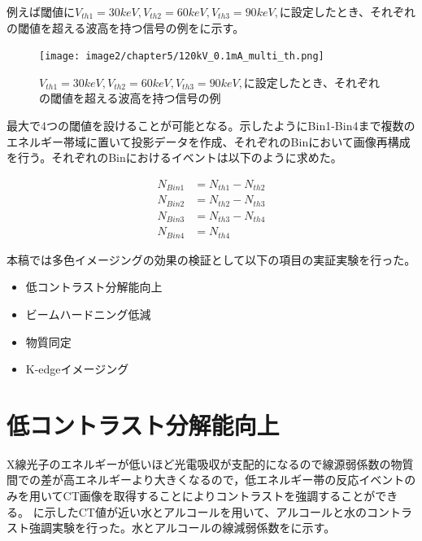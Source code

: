 例えば閾値に$V_{th1}=30keV, V_{th2}=60keV, V_{th3}=90keV,$に設定したとき、それぞれの閾値を超える波高を持つ信号の例をに示す。

\begin{figure}[H]
 \begin{center}
 \texttt{[image: image2/chapter5/120kV\_0.1mA\_multi\_th.png]} 
 \end{center}
 \caption{$V_{th1}=30keV, V_{th2}=60keV, V_{th3}=90keV,$に設定したとき、それぞれの閾値を超える波高を持つ信号の例}
 \label{fig:120kV_0.1mA_multi_th}
\end{figure}

最大で4つの閾値を設けることが可能となる。示したようにBin1-Bin4まで複数のエネルギー帯域に置いて投影データを作成、それぞれのBinにおいて画像再構成を行う。それぞれのBinにおけるイベントは以下のように求めた。

\begin{align}
N_{Bin1}&=N_{th1}-N_{th2}\\
N_{Bin2}&=N_{th2}-N_{th3}\\
N_{Bin3}&=N_{th3}-N_{th4}\\
N_{Bin4}&=N_{th4}
\end{align}


本稿では多色イメージングの効果の検証として以下の項目の実証実験を行った。

\begin{itemize}
\item 低コントラスト分解能向上
\item ビームハードニング低減
\item 物質同定
\item K-edgeイメージング
\end{itemize}


\section{低コントラスト分解能向上}
X線光子のエネルギーが低いほど光電吸収が支配的になるので線源弱係数の物質間での差が高エネルギーより大きくなるので，低エネルギー帯の反応イベントのみを用いてCT画像を取得することによりコントラストを強調することができる。
に示したCT値が近い水とアルコールを用いて、アルコールと水のコントラスト強調実験を行った。水とアルコールの線減弱係数をに示す。

